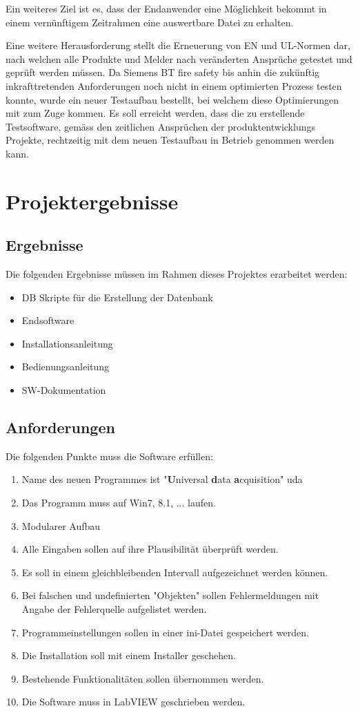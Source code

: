 \documentclass[10pt]{scrartcl}
\begin{document}
Ein weiteres Ziel ist es, dass der Endanwender eine Möglichkeit bekommt in einem vernünftigem Zeitrahmen eine auswertbare Datei zu erhalten.

Eine weitere Herausforderung stellt die Erneuerung von EN und UL-Normen dar, nach welchen alle Produkte und Melder nach veränderten Ansprüche getestet und geprüft werden müssen. Da Siemens BT fire safety bis anhin die zukünftig inkrafttretenden Anforderungen noch nicht in einem optimierten Prozess testen konnte, wurde ein neuer Testaufbau bestellt, bei welchem diese Optimierungen mit zum Zuge kommen. Es soll erreicht werden, dass die zu erstellende Testsoftware, gemäss den zeitlichen Ansprüchen der produktentwicklungs Projekte, rechtzeitig mit dem neuen Testaufbau in Betrieb genommen werden kann.
\section{Projektergebnisse}
\subsection{Ergebnisse}
Die folgenden Ergebnisse müssen im Rahmen dieses Projektes erarbeitet werden:
\begin{itemize}
	\item DB Skripte für die Erstellung der Datenbank
	\item Endsoftware
	\item Installationsanleitung
	\item Bedienungsanleitung
	\item SW-Dokumentation
\end{itemize}
\subsection{Anforderungen}
Die folgenden Punkte muss die Software erfüllen:
\begin{enumerate}
	\item Name des neuen Programmes ist "\textbf{U}niversal \textbf{d}ata \textbf{a}cquisition" \acrshort{uda}
	\item Das Programm muss auf Win7, 8.1, ... laufen.
	\item Modularer Aufbau
	\item Alle Eingaben sollen auf ihre Plausibilität überprüft werden.
	\item Es soll in einem gleichbleibenden Intervall aufgezeichnet werden können.
	\item Bei falschen und undefinierten "Objekten" sollen Fehlermeldungen mit Angabe der Fehlerquelle aufgelistet werden.
	\item Programmeinstellungen sollen in einer ini-Datei gespeichert werden.
	\item Die Installation soll mit einem Installer geschehen.
	\item Bestehende Funktionalitäten sollen übernommen werden.
	\item Die Software muss in \gls{LabVIEW} geschrieben werden.
\end{enumerate}
\end{document}
